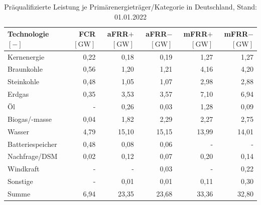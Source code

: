 			\begin{table}[H]
				\renewcommand*{\arraystretch}{1.2} %
				\centering
				\caption{Präqualifizierte Leistung je Primärenergieträger/Kategorie in Deutschland, Stand: 01.01.2022 \cite{regelleistungnet_PRL_Ausschreibung}}
				\label{Tab. Übersicht der Präqualifizierten Leistung je PrimärenergieträgerKategorie in Deutschland}
				\begin{tabular}{lrrrrr}
					\hline
					\makecell[c]{Technologie \\ $\left[-\right]$} & \makecell[c]{FCR \\ $\left[\si{\giga\watt}\right]$}  & \makecell[c]{aFRR$+$ \\ $\left[\si{\giga\watt}\right]$} & \makecell[c]{aFRR$-$ \\ $\left[\si{\giga\watt}\right]$} & \makecell[c]{mFRR$+$ \\ $\left[\si{\giga\watt}\right]$} & \makecell[c]{mFRR$-$ \\ $\left[\si{\giga\watt}\right]$} \\ \hline
					Kernenergie & 0,22 & 0,18 & 0,19 & 1,27 & 1,27 \\
					Braunkohle & 0,56 & 1,20 & 1,21 & 4,16 & 4,20 \\
					Steinkohle & 0,48 & 1,05 & 1,07 & 2,98 & 2,88 \\
					Erdgas & 0,35 & 3,53 & 3,57 & 7,10 & 6,94 \\
					Öl & - & 0,26 & 0,03 & 1,28 & 0,09 \\
					Biogas/-masse & 0,04 & 1,82 & 2,29 & 2,27 & 2,75 \\
					Wasser & 4,79 & 15,10 & 15,15 & 13,99 & 14,01 \\
					Batteriespeicher & 0,48 & 0,08 & 0,06 & - & - \\
					Nachfrage/DSM & 0,02 & 0,12 & 0,07 & 0,20 & 0,14 \\
					Windkraft & - & - & 0,03 & - & 0,22 \\
					Sonstige & - & 0,01 & 0,01 & 0,11 & 0,30 \\ \hline
					Summe & 6,94 & 23,35 & 23,68 & 33,36 & 32,80
				\end{tabular}
				\renewcommand*{\arraystretch}{1.3} %
			\end{table}
			\renewcommand*{\arraystretch}{1.3} %
			
